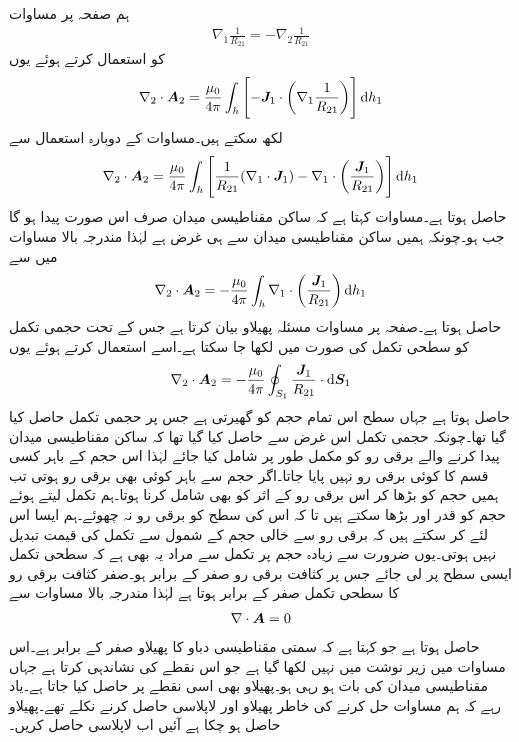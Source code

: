 ہم صفحہ  پر مساوات 
\begin{align*}
\nabla_1 \frac{1}{R_{21}}=-\nabla_2 \frac{1}{R_{21}}
\end{align*}
کو استعمال کرتے ہوئے یوں 
\begin{align}
\nabla_2 \cdot \kvec{A}_2=\frac{\mu_0}{4\pi}\int_h \left[-\kvec{J}_1 \cdot \left(\nabla_1 \frac{1}{R_{21}}\right)\right] \dif h_1
\end{align}
لکھ سکتے ہیں۔مساوات  کے دوبارہ استعمال سے 
\begin{align}
\nabla_2 \cdot \kvec{A}_2=\frac{\mu_0}{4\pi}\int_h \left[\frac{1}{R_{21}} (\nabla_1 \cdot \kvec{J}_1)-\nabla_1 \cdot \left(\frac{\kvec{J}_1}{R_{21}} \right)\right] \dif h_1
\end{align}
حاصل ہوتا ہے۔مساوات  کہتا ہے کہ ساکن مقناطیسی میدان صرف اس صورت پیدا ہو گا جب  ہو۔چونکہ ہمیں ساکن مقناطیسی میدان سے ہی غرض ہے لہٰذا مندرجہ بالا مساوات میں سے
\begin{align}
\nabla_2 \cdot \kvec{A}_2=-\frac{\mu_0}{4\pi}\int_h \nabla_1 \cdot \left(\frac{\kvec{J}_1}{R_{21}} \right) \dif h_1
\end{align}
حاصل ہوتا ہے۔صفحہ  پر مساوات  مسئلہ پھیلاو بیان کرتا ہے جس کے تحت حجمی تکمل کو سطحی تکمل کی صورت میں لکھا جا سکتا ہے۔اسے استعمال کرتے ہوئے یوں
\begin{align}
\nabla_2 \cdot \kvec{A}_2=-\frac{\mu_0}{4\pi}\oint_{S_1} \frac{\kvec{J}_1}{R_{21}} \cdot \dif \kvec{S}_1
\end{align}
حاصل ہوتا ہے جہاں سطح  اس تمام حجم کو گھیرتی ہے جس پر حجمی تکمل حاصل کیا گیا تھا۔چونکہ حجمی تکمل اس غرض سے حاصل کیا گیا تھا کہ ساکن مقناطیسی میدان پیدا کرنے والے برقی رو کو مکمل طور پر شامل کیا جائے  لہٰذا اس حجم کے باہر کسی قسم کا کوئی برقی رو نہیں پایا جاتا۔اگر حجم سے باہر کوئی بھی برقی رو ہوتی تب ہمیں حجم کو بڑھا کر اس برقی رو کے اثر کو بھی شامل کرنا ہوتا۔ہم تکمل لیتے ہوئے حجم کو قدر اور بڑھا سکتے ہیں تا کہ اس کی سطح کو برقی رو نہ چھوئے۔ہم ایسا اس لئے کر سکتے ہیں کہ برقی رو سے خالی حجم کے شمول سے تکمل کی قیمت تبدیل نہیں ہوتی۔یوں ضرورت سے زیادہ حجم پر تکمل سے مراد یہ بھی ہے کہ سطحی تکمل ایسی سطح پر لی جائے جس پر کثافت برقی رو صفر کے برابر ہو۔صفر کثافت برقی رو کا سطحی تکمل صفر کے برابر ہوتا ہے لہٰذا مندرجہ بالا مساوات سے
\begin{align}\label{مساوات_مقناطیسی_سمتی_مقناطیسی_دباو_کی_پھیلاو_صفر_ہے}
\nabla \cdot {\ensuremath{{\boldsymbol{A}}}}=0
\end{align}
حاصل ہوتا ہے جو کہتا ہے کہ سمتی مقناطیسی دباو کا پھیلاو صفر کے برابر ہے۔اس مساوات میں زیر نوشت میں  نہیں لکھا گیا ہے جو اس نقطے کی نشاندہی کرتا ہے جہاں مقناطیسی میدان کی بات ہو رہی ہو۔پھیلاو بھی اسی نقطے پر حاصل کیا جاتا ہے۔یاد رہے کہ ہم مساوات  حل کرنے کی خاطر پھیلاو اور لاپلاسی حاصل کرنے نکلے تھے۔پھیلاو حاصل ہو چکا ہے آئیں اب لاپلاسی حاصل کریں۔  

